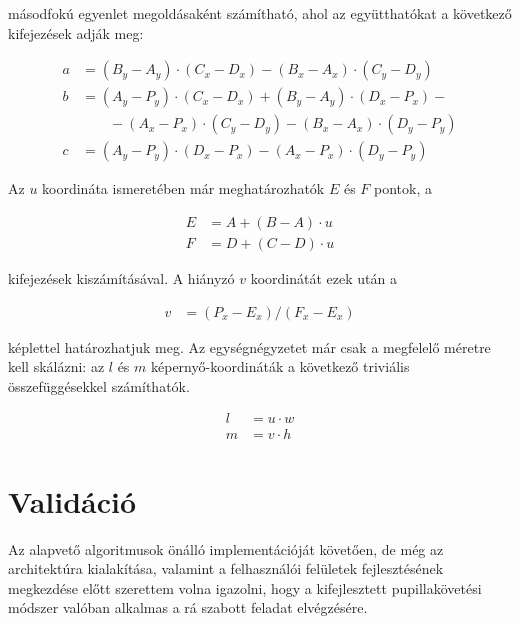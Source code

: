 másodfokú egyenlet megoldásaként számítható, ahol az együtthatókat a következő kifejezések adják meg:

\begin{align}\label{eq:calib_2}
a &= (B_y - A_y) \cdot (C_x - D_x) - (B_x - A_x) \cdot (C_y - D_y) \nonumber \\
b &= (A_y - P_y) \cdot (C_x - D_x) + (B_y - A_y) \cdot (D_x - P_x) - \nonumber \\ 
  & \qquad - (A_x - P_x) \cdot (C_y - D_y) - (B_x - A_x) \cdot (D_y - P_y) \nonumber \\
c &= (A_y - P_y) \cdot (D_x - P_x) - (A_x - P_x) \cdot (D_y - P_y)
\end{align}

Az $u$ koordináta ismeretében már meghatározhatók $E$ és $F$ pontok, a

\begin{align}\label{eq:calib_3}
E &= A + (B-A) \cdot u \nonumber \\
F &= D + (C-D) \cdot u
\end{align}

kifejezések kiszámításával. A hiányzó $v$ koordinátát ezek után a 

\begin{align}\label{eq:calib_4}
v &= (P_x - E_x) / (F_x - E_x)
\end{align}

képlettel határozhatjuk meg. Az egységnégyzetet már csak a megfelelő méretre kell skálázni: az $l$ és $m$ képernyő-koordináták a következő triviális összefüggésekkel számíthatók.

\begin{align}\label{eq:calib_5}
l &= u \cdot w \nonumber \\
m &= v \cdot h
\end{align}

\section{Validáció}\label{sect:validacio}

Az alapvető algoritmusok önálló implementációját követően, de még az architektúra kialakítása, valamint a felhasználói felületek fejlesztésének megkezdése előtt szerettem volna igazolni, hogy a kifejlesztett pupillakövetési módszer valóban alkalmas a rá szabott feladat elvégzésére.

